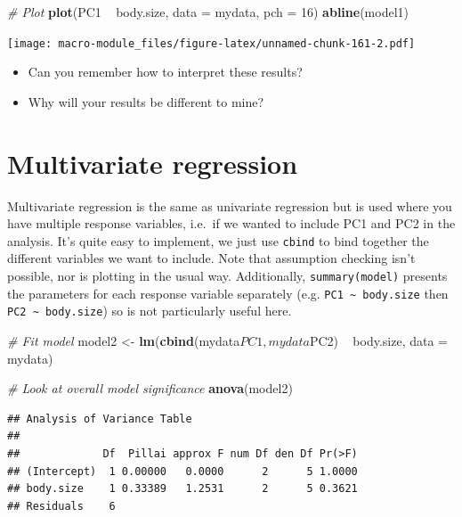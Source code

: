 \documentclass[]{book}
\newenvironment{Shaded}{\begin{snugshade}}{\end{snugshade}}
\newcommand{\KeywordTok}[1]{\textcolor[rgb]{0.13,0.29,0.53}{\textbf{{#1}}}}
\newcommand{\DataTypeTok}[1]{\textcolor[rgb]{0.13,0.29,0.53}{{#1}}}
\newcommand{\DecValTok}[1]{\textcolor[rgb]{0.00,0.00,0.81}{{#1}}}
\newcommand{\StringTok}[1]{\textcolor[rgb]{0.31,0.60,0.02}{{#1}}}
\newcommand{\CommentTok}[1]{\textcolor[rgb]{0.56,0.35,0.01}{\textit{{#1}}}}
\newcommand{\NormalTok}[1]{{#1}}
\providecommand{\tightlist}{%
  \setlength{\itemsep}{0pt}\setlength{\parskip}{0pt}}
\begin{document}
\begin{Shaded}
\begin{Highlighting}[]
\CommentTok{# Plot}
\KeywordTok{plot}\NormalTok{(PC1 ~}\StringTok{ }\NormalTok{body.size, }\DataTypeTok{data =} \NormalTok{mydata, }\DataTypeTok{pch =} \DecValTok{16}\NormalTok{)}
\KeywordTok{abline}\NormalTok{(model1)}
\end{Highlighting}
\end{Shaded}

\texttt{[image: macro-module\_files/figure-latex/unnamed-chunk-161-2.pdf]}

\begin{itemize}
\tightlist
\item
  Can you remember how to interpret these results?
\item
  Why will your results be different to mine?
\end{itemize}

\section{Multivariate regression}\label{multivariate-regression}

Multivariate regression is the same as univariate regression but is used
where you have multiple response variables, i.e.~if we wanted to include
PC1 and PC2 in the analysis. It's quite easy to implement, we just use
\texttt{cbind} to bind together the different variables we want to
include. Note that assumption checking isn't possible, nor is plotting
in the usual way. Additionally, \texttt{summary(model)} presents the
parameters for each response variable separately (e.g.
\texttt{PC1\ \textasciitilde{}\ body.size} then
\texttt{PC2\ \textasciitilde{}\ body.size}) so is not particularly
useful here.

\begin{Shaded}
\begin{Highlighting}[]
\CommentTok{# Fit model}
\NormalTok{model2 <-}\StringTok{ }\KeywordTok{lm}\NormalTok{(}\KeywordTok{cbind}\NormalTok{(mydata$PC1,mydata$PC2) ~}\StringTok{ }\NormalTok{body.size, }\DataTypeTok{data =} \NormalTok{mydata)}

\CommentTok{# Look at overall model significance}
\KeywordTok{anova}\NormalTok{(model2)}
\end{Highlighting}
\end{Shaded}

\begin{verbatim}
## Analysis of Variance Table
## 
##             Df  Pillai approx F num Df den Df Pr(>F)
## (Intercept)  1 0.00000   0.0000      2      5 1.0000
## body.size    1 0.33389   1.2531      2      5 0.3621
## Residuals    6
\end{verbatim}
\end{document}
